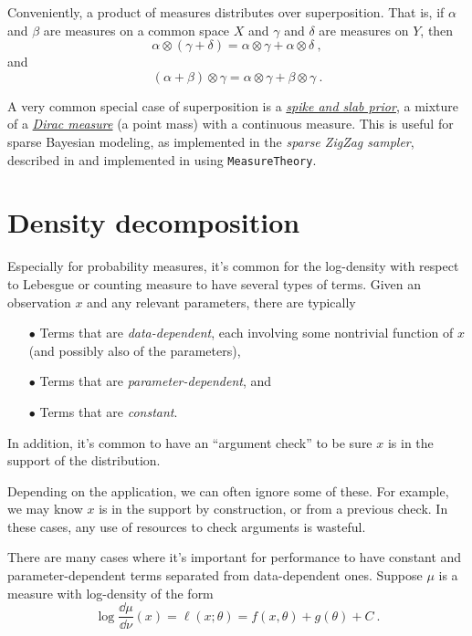 \documentclass{juliacon}
\begin{document}
Conveniently, a product of measures distributes over superposition. That is, if $\alpha$ and $\beta$ are measures on a common space $X$ and $\gamma$ and $\delta$ are measures on $Y$, then
\[
\alpha \otimes (\gamma + \delta) = \alpha \otimes \gamma + \alpha \otimes \delta\ ,
\]
and
\[
(\alpha + \beta) \otimes \gamma = \alpha \otimes \gamma + \beta \otimes \gamma\ .
\]

A very common special case of superposition is a \href{https://en.wikipedia.org/wiki/Spike-and-slab_regression}{\emph{spike and slab prior}}, a mixture of a \href{https://en.wikipedia.org/wiki/Dirac_measure}{\emph{Dirac measure}} (a point mass) with a continuous measure. 
This is useful for sparse Bayesian modeling, as implemented in the \emph{sparse ZigZag sampler}, described in \cite{arxiv2103.08478} and implemented in \cite{https://doi.org/10.5281/zenodo.3931118} using \verb|MeasureTheory|.

\section{Density decomposition}

Especially for probability measures, it's common for the log-density with respect to Lebesgue or counting measure to have several types of terms. Given an observation $x$ and any relevant parameters, there are typically 
\begin{itemize}
    \item[$\bullet\!$] Terms that are \emph{data-dependent}, each involving some nontrivial function of $x$ (and possibly also of the parameters),
    \item[$\bullet\!$] Terms that are \emph{parameter-dependent}, and
    \item[$\bullet\!$] Terms that are \emph{constant}.
\end{itemize}

In addition, it's common to have an ``argument check'' to be sure $x$ is in the support of the distribution.

Depending on the application, we can often ignore some of these. For example, we may know $x$ is in the support by construction, or from a previous check. In these cases, any use of resources to check arguments is wasteful.

There are many cases where it's important for performance to have constant and parameter-dependent terms separated from data-dependent ones. Suppose $\mu$ is a measure with log-density of the form
\[
\log \frac{\dd\mu}{\dd\nu}(x) = \ell(x; \theta) = f(x,\theta) + g(\theta) + C\ .
\]
\end{document}

